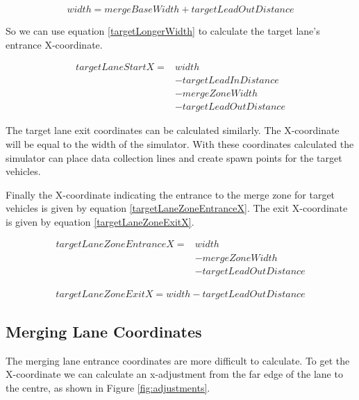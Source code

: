 \begin{equation} \label{mergeLongerWidth}
width = mergeBaseWidth + targetLeadOutDistance
\end{equation}

So we can use equation \ref{targetLongerWidth} to calculate the target lane's entrance X-coordinate.

\begin{equation}\label{targetLaneStartX}
	\begin{split}
targetLaneStartX = & width \\
				   & - targetLeadInDistance \\
				   & - mergeZoneWidth \\				
				   & - targetLeadOutDistance	
	\end{split}
\end{equation}

The target lane exit coordinates can be calculated similarly. The X-coordinate will be equal to the width of the simulator. With these coordinates calculated the simulator can place data collection lines and create spawn points for the target vehicles.

Finally the X-coordinate indicating the entrance to the merge zone for target vehicles is given by equation \ref{targetLaneZoneEntranceX}. The exit X-coordinate is given by equation \ref{targetLaneZoneExitX}.

\begin{equation}\label{targetLaneZoneEntranceX}
	\begin{split}
targetLaneZoneEntranceX = & width \\
						  & - mergeZoneWidth \\
						  & - targetLeadOutDistance
	\end{split}
\end{equation}

\begin{equation}\label{targetLaneZoneExitX}
	\begin{split}
targetLaneZoneExitX = width - targetLeadOutDistance
	\end{split}
\end{equation}

\subsection{Merging Lane Coordinates}
\label{subsec:Merging Lane Coordinates}
The merging lane entrance coordinates are more difficult to calculate. To get the X-coordinate we can calculate an x-adjustment from the far edge of the lane to the centre, as shown in Figure \ref{fig:adjustments}.

